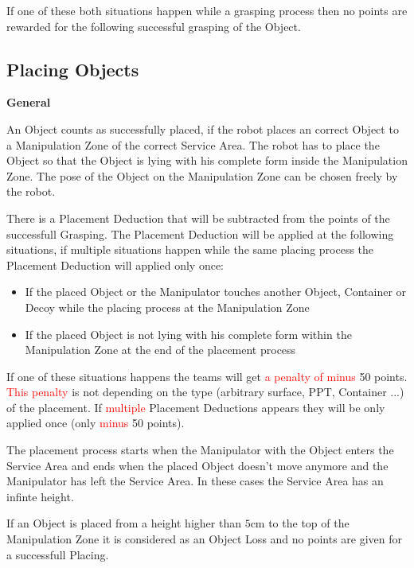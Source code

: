 If one of these both situations happen while a grasping process then no points are rewarded for the following successful grasping of the Object.

\subsection{Placing Objects} \label{ssec:PlacingObjects}

\textbf{General}

An Object counts as successfully placed, if the robot places an correct Object to a Manipulation Zone of the correct Service Area. The robot has to place the Object so that the Object is lying with his complete form inside the Manipulation Zone. The pose of the Object on the Manipulation Zone can be chosen freely by the robot.

There is a Placement Deduction that will be subtracted from the points of the successfull Grasping. The Placement Deduction will be applied at the following situations, if multiple situations happen while the same placing process the Placement Deduction will applied only once:

\begin{itemize}
	\item If the placed Object or the Manipulator touches another Object, Container or Decoy while the placing process at the Manipulation Zone 
	\item If the placed Object is not lying with his complete form within the Manipulation Zone at the end of the placement process
\end{itemize}


If one of these situations happens the teams will get \textcolor{red}{a penalty of minus} 50 points. \textcolor{red}{This penalty} is not depending on the type (arbitrary surface, PPT, Container ...) of the placement. If \textcolor{red}{multiple} Placement Deductions appears they will be only applied once (only \textcolor{red}{minus} 50 points).

The placement process starts when the Manipulator with the Object enters the Service Area and ends when the placed Object doesn't move anymore and the Manipulator has left the Service Area. In these cases the Service Area has an infinte height.


If an Object is placed from a height higher than $5\si{\centi\meter}$ to the top of the Manipulation Zone it is considered as an Object Loss and no points are given for a successfull Placing.

